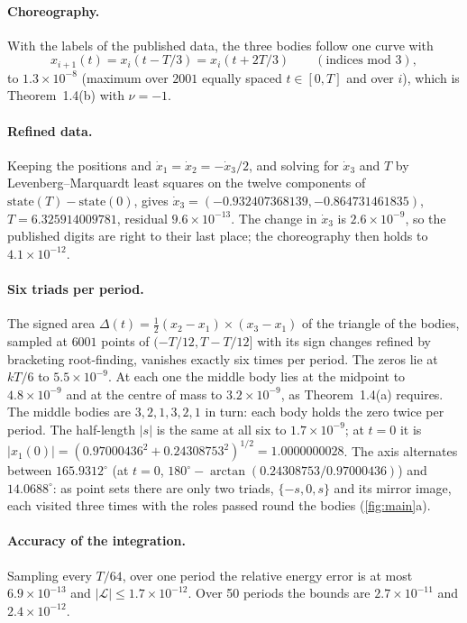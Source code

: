 \documentclass[11pt]{article}
\theoremstyle{definition}\newtheorem{definition}[theorem]{Definition}
\theoremstyle{remark}\newtheorem{remark}[theorem]{Remark}
\begin{document}
\paragraph{Choreography.} With the labels of the published data, the three bodies follow one curve with
\[
x_{i+1}(t)=x_i(t-T/3)=x_i(t+2T/3)\qquad(\text{indices mod }3),
\]
to $1.3\times10^{-8}$ (maximum over $2001$ equally spaced $t\in[0,T]$ and over $i$), which is Theorem~1.4(b) with $\nu=-1$.

\paragraph{Refined data.} Keeping the positions and $\dot x_1=\dot x_2=-\dot x_3/2$, and solving for $\dot x_3$ and $T$ by Levenberg--Marquardt least squares on the twelve components of $\mathrm{state}(T)-\mathrm{state}(0)$, gives $\dot x_3=(-0.932407368139,-0.864731461835)$, $T=6.325914009781$, residual $9.6\times10^{-13}$. The change in $\dot x_3$ is $2.6\times10^{-9}$, so the published digits are right to their last place; the choreography then holds to $4.1\times10^{-12}$.

\paragraph{Six triads per period.} The signed area $\Delta(t)=\tfrac12(x_2-x_1)\times(x_3-x_1)$ of the triangle of the bodies, sampled at $6001$ points of $(-T/12,T-T/12]$ with its sign changes refined by bracketing root-finding, vanishes exactly six times per period. The zeros lie at $kT/6$ to $5.5\times10^{-9}$. At each one the middle body lies at the midpoint to $4.8\times10^{-9}$ and at the centre of mass to $3.2\times10^{-9}$, as Theorem~1.4(a) requires. The middle bodies are $3,2,1,3,2,1$ in turn: each body holds the zero twice per period. The half-length $|s|$ is the same at all six to $1.7\times10^{-9}$; at $t=0$ it is $|x_1(0)|=(0.97000436^2+0.24308753^2)^{1/2}=1.0000000028$. The axis alternates between $165.9312^\circ$ (at $t=0$, $180^\circ-\arctan(0.24308753/0.97000436)$) and $14.0688^\circ$: as point sets there are only two triads, $\{-s,0,s\}$ and its mirror image, each visited three times with the roles passed round the bodies (\cref{fig:main}a).

\paragraph{Accuracy of the integration.} Sampling every $T/64$, over one period the relative energy error is at most $6.9\times10^{-13}$ and $|\mathcal L|\le1.7\times10^{-12}$. Over 50 periods the bounds are $2.7\times10^{-11}$ and $2.4\times10^{-12}$.
\end{document}
